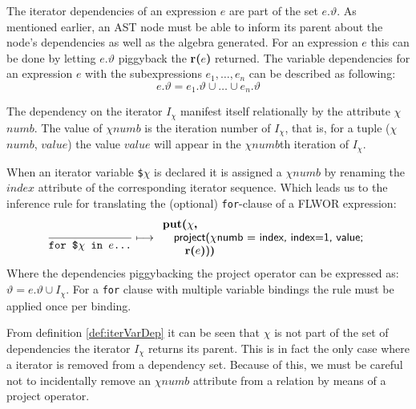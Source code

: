 The iterator dependencies of an expression $e$ are part of the set $e.\vartheta$. As mentioned earlier,
an AST node must be able to inform its parent about the node's dependencies as well as the algebra generated. For
an expression $e$ this can be done by letting $e.\vartheta$ piggyback the \textbf{r(}$e$\textbf{)} returned. The
variable dependencies for an expression $e$ with the subexpressions $e_{1},\ldots,e_{n}$ can be described as
following:
\begin{equation}
e.\vartheta = e_{1}.\vartheta\cup\ldots\cup e_{n}.\vartheta
\label{eq:trans:TD:depInheritance}
\end{equation}

The dependency on the iterator $I_{\chi}$ manifest itself relationally by the
attribute $\chi$$numb$. The value of $\chi$$numb$ is the iteration number of $I_{\chi}$, that is, for a tuple ($\chi$$numb$, $value$) the value $value$
will appear in the $\chi$$numb$th iteration of $I_{\chi}$.

When an iterator variable \texttt{\$}$\chi$ is declared it is assigned a $\chi$$numb$ by renaming the $index$
attribute of the corresponding iterator sequence. Which leads us to the inference rule for translating
the (optional) \texttt{for}-clause of a FLWOR expression:
\begin{equation}
\frac{}{\mbox{\texttt{for \$}}\chi \mbox{\texttt{ in }} e \mbox{\texttt{\ldots}}}\longmapsto
\begin{array}{l}
\mbox{\textbf{put(}}\chi\mbox{\textbf{, }} \\ \quad
\mbox{\textsf{project(}}\chi\mbox{\textsf{numb = index, index=1, value;}} \\ \quad \quad
\mbox{\textbf{r(}}e\mbox{\textbf{)}\textsf{)}\textbf{)}}
\end{array}
\label{rule:trans:TD:forbind}
\end{equation}
Where the dependencies piggybacking the \textsf{project} operator can be
expressed as: $\vartheta = e.\vartheta \cup I_{\chi}$. For a \texttt{for} clause with multiple variable bindings
the rule must be applied once per binding.

From definition \ref{def:iterVarDep} it can be seen that $\chi$ is not part of
the set of dependencies the iterator $I_{\chi}$ returns its parent. This is in
fact the only case where a iterator is removed from a dependency set. Because of this, we must be careful not to
incidentally remove an $\chi$$numb$ attribute from a relation by means of a
\textsf{project} operator.

